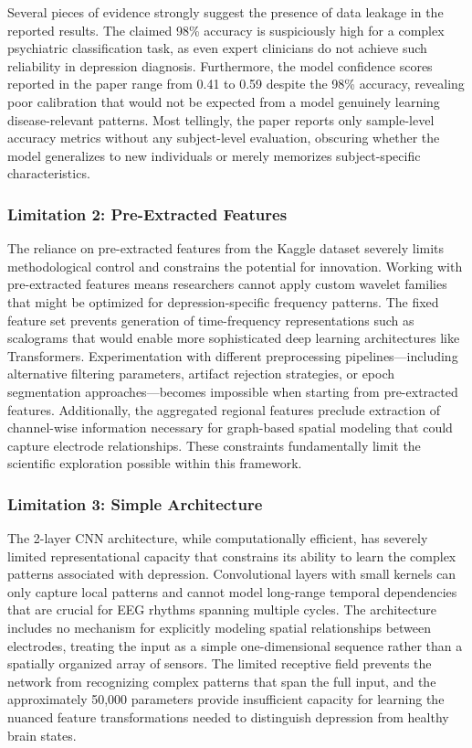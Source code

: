 Several pieces of evidence strongly suggest the presence of data leakage in the reported results. The claimed 98\% accuracy is suspiciously high for a complex psychiatric classification task, as even expert clinicians do not achieve such reliability in depression diagnosis. Furthermore, the model confidence scores reported in the paper range from 0.41 to 0.59 despite the 98\% accuracy, revealing poor calibration that would not be expected from a model genuinely learning disease-relevant patterns. Most tellingly, the paper reports only sample-level accuracy metrics without any subject-level evaluation, obscuring whether the model generalizes to new individuals or merely memorizes subject-specific characteristics.

\subsubsection{Limitation 2: Pre-Extracted Features}

The reliance on pre-extracted features from the Kaggle dataset severely limits methodological control and constrains the potential for innovation. Working with pre-extracted features means researchers cannot apply custom wavelet families that might be optimized for depression-specific frequency patterns. The fixed feature set prevents generation of time-frequency representations such as scalograms that would enable more sophisticated deep learning architectures like Transformers. Experimentation with different preprocessing pipelines---including alternative filtering parameters, artifact rejection strategies, or epoch segmentation approaches---becomes impossible when starting from pre-extracted features. Additionally, the aggregated regional features preclude extraction of channel-wise information necessary for graph-based spatial modeling that could capture electrode relationships. These constraints fundamentally limit the scientific exploration possible within this framework.

\subsubsection{Limitation 3: Simple Architecture}

The 2-layer CNN architecture, while computationally efficient, has severely limited representational capacity that constrains its ability to learn the complex patterns associated with depression. Convolutional layers with small kernels can only capture local patterns and cannot model long-range temporal dependencies that are crucial for EEG rhythms spanning multiple cycles. The architecture includes no mechanism for explicitly modeling spatial relationships between electrodes, treating the input as a simple one-dimensional sequence rather than a spatially organized array of sensors. The limited receptive field prevents the network from recognizing complex patterns that span the full input, and the approximately 50,000 parameters provide insufficient capacity for learning the nuanced feature transformations needed to distinguish depression from healthy brain states.

